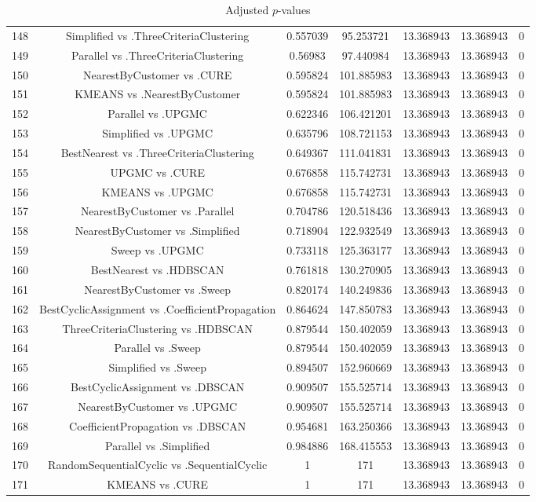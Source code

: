 \documentclass[a4paper,10pt]{article}
\begin{document}
\begin{landscape}
\begin{table}[!htp]
\begin{tabular}{ccccccc}
148&Simplified vs .ThreeCriteriaClustering&0.557039&95.253721&13.368943&13.368943&0\\
149&Parallel vs .ThreeCriteriaClustering&0.56983&97.440984&13.368943&13.368943&0\\
150&NearestByCustomer vs .CURE&0.595824&101.885983&13.368943&13.368943&0\\
151&KMEANS vs .NearestByCustomer&0.595824&101.885983&13.368943&13.368943&0\\
152&Parallel vs .UPGMC&0.622346&106.421201&13.368943&13.368943&0\\
153&Simplified vs .UPGMC&0.635796&108.721153&13.368943&13.368943&0\\
154&BestNearest vs .ThreeCriteriaClustering&0.649367&111.041831&13.368943&13.368943&0\\
155&UPGMC vs .CURE&0.676858&115.742731&13.368943&13.368943&0\\
156&KMEANS vs .UPGMC&0.676858&115.742731&13.368943&13.368943&0\\
157&NearestByCustomer vs .Parallel&0.704786&120.518436&13.368943&13.368943&0\\
158&NearestByCustomer vs .Simplified&0.718904&122.932549&13.368943&13.368943&0\\
159&Sweep vs .UPGMC&0.733118&125.363177&13.368943&13.368943&0\\
160&BestNearest vs .HDBSCAN&0.761818&130.270905&13.368943&13.368943&0\\
161&NearestByCustomer vs .Sweep&0.820174&140.249836&13.368943&13.368943&0\\
162&BestCyclicAssignment vs .CoefficientPropagation&0.864624&147.850783&13.368943&13.368943&0\\
163&ThreeCriteriaClustering vs .HDBSCAN&0.879544&150.402059&13.368943&13.368943&0\\
164&Parallel vs .Sweep&0.879544&150.402059&13.368943&13.368943&0\\
165&Simplified vs .Sweep&0.894507&152.960669&13.368943&13.368943&0\\
166&BestCyclicAssignment vs .DBSCAN&0.909507&155.525714&13.368943&13.368943&0\\
167&NearestByCustomer vs .UPGMC&0.909507&155.525714&13.368943&13.368943&0\\
168&CoefficientPropagation vs .DBSCAN&0.954681&163.250366&13.368943&13.368943&0\\
169&Parallel vs .Simplified&0.984886&168.415553&13.368943&13.368943&0\\
170&RandomSequentialCyclic vs .SequentialCyclic&1&171&13.368943&13.368943&0\\
171&KMEANS vs .CURE&1&171&13.368943&13.368943&0\\
\hline
\end{tabular}
\caption{Adjusted $p$-values}
\end{table}

\end{landscape}
\end{document}
